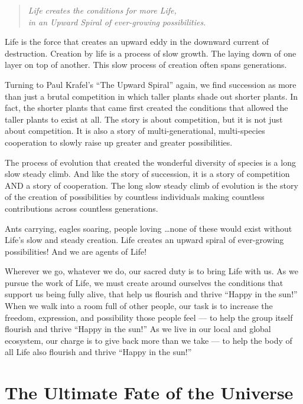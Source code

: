 \documentclass[ebook,11pt,openany,twoside,showtrims]{memoir}
\begin{document}
\begin{verse}
\begin{patverse}
\em
Life creates the conditions for more Life,\\
in an Upward Spiral of ever-growing possibilities.\\
\end{patverse}
\end{verse}

Life is the force that creates an upward eddy in the downward current of
destruction. Creation by life is a process of slow growth. The laying down of
one layer on top of another. This slow process of creation often spans
generations.

Turning to Paul Krafel's ``The Upward Spiral'' again, we find succession as
more than just a brutal competition in which taller plants shade out shorter
plants. In fact, the shorter plants that came first created the conditions that
allowed the taller plants to exist at all. The story is about competition, but
it is not just about competition. It is also a story of multi-generational,
multi-species cooperation to slowly raise up greater and greater possibilities.

The process of evolution that created the wonderful diversity of species is a
long slow steady climb. And like the story of succession, it is a story of
competition AND a story of cooperation. The long slow steady climb of evolution
is the story of the creation of possibilities by countless individuals making
countless contributions across countless generations.

Ants carrying, eagles soaring, people loving \ldots none of these would exist
without Life's slow and steady creation. Life creates an upward spiral of
ever-growing possibilities! And we are agents of Life!

Wherever we go, whatever we do, our sacred duty is to bring Life with us. As we
pursue the work of Life, we must create around ourselves the conditions that
support us being fully alive, that help us flourish and thrive ``Happy in the
sun!'' When we walk into a room full of other people, our task is to increase
the freedom, expression, and possibility those people feel --- to help the
group itself flourish and thrive ``Happy in the sun!'' As we live in our local
and global ecosystem, our charge is to give back more than we take --- to help
the body of all Life also flourish and thrive ``Happy in the sun!''

\section*{The Ultimate Fate of the Universe}
\end{document}

